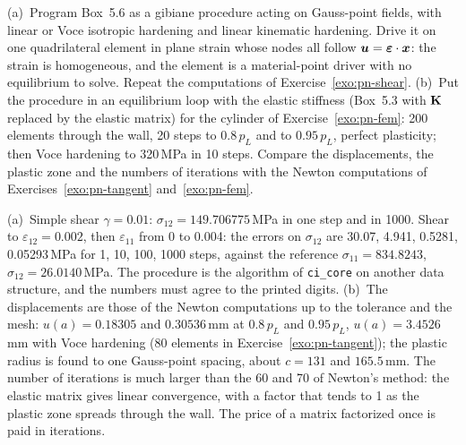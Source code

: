 \label{exo:pn-fields}
%
(a)~Program Box~5.6 as a gibiane procedure acting on Gauss-point fields, with
linear or Voce isotropic hardening and linear kinematic hardening. Drive it on
one quadrilateral element in plane strain whose nodes all follow
$\bm{u}=\bm{\varepsilon}\cdot\bm{x}$: the strain is homogeneous, and the element is a
material-point driver with no equilibrium to solve. Repeat the computations of
Exercise~\ref{exo:pn-shear}. (b)~Put the procedure in an equilibrium loop with
the elastic stiffness (Box~5.3 with $\mathbf{K}$ replaced by the elastic matrix)
for the cylinder of Exercise~\ref{exo:pn-fem}: 200 elements through the wall,
20 steps to $0.8\,p_L$ and to $0.95\,p_L$, perfect plasticity; then Voce
hardening to 320\,MPa in 10 steps. Compare the displacements, the plastic zone
and the numbers of iterations with the Newton computations of
Exercises~\ref{exo:pn-tangent} and~\ref{exo:pn-fem}.
\begin{solution}
(a)~Simple shear $\gamma=0.01$: $\sigma_{12}=149.706775$\,MPa in one step and in
1000. Shear to $\varepsilon_{12}=0.002$, then $\varepsilon_{11}$ from 0 to 0.004:
the errors on $\sigma_{12}$ are 30.07, 4.941, 0.5281, 0.05293\,MPa for 1, 10,
100, 1000 steps, against the reference $\sigma_{11}=834.8243$,
$\sigma_{12}=26.0140$\,MPa. The procedure is the algorithm of
\texttt{ci\_core} on another data structure, and the numbers must agree to the
printed digits. (b)~The displacements are those of the Newton computations up to
the tolerance and the mesh: $u(a)=0.18305$ and $0.30536$\,mm at $0.8\,p_L$ and
$0.95\,p_L$, $u(a)=3.4526$\,mm with Voce hardening (80 elements in
Exercise~\ref{exo:pn-tangent}); the plastic radius is found to one Gauss-point
spacing, about $c=131$ and $165.5$\,mm. The number of iterations is much larger
than the 60 and 70 of Newton's method: the elastic matrix gives linear
convergence, with a factor that tends to 1 as the plastic zone spreads through
the wall. The price of a matrix factorized once is paid in iterations.
\ifdraft


\fi
\end{solution}


